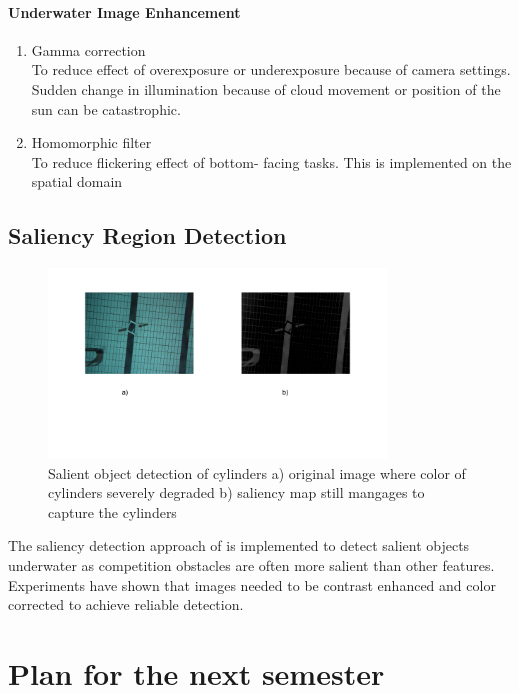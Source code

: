 \documentclass[fypca]{socreport}
\begin{document}
\subsubsection{Underwater Image Enhancement}
    \begin{enumerate}
        \item Gamma correction \\ To reduce effect of overexposure or underexposure because of camera settings. Sudden change in illumination because of cloud movement or position of the sun can be catastrophic.
        \item Homomorphic filter \\ To reduce flickering effect of bottom- facing tasks. This is implemented on the spatial domain \cite{nnolim2008homomorphic}
    \end{enumerate}
    
\section{Saliency Region Detection}
\begin{figure}[h]
    \centering
            \includegraphics[width=0.8\textwidth, height=0.3\textheight]{saliency.png}
            \caption{Salient object detection of cylinders a) original image where color of cylinders severely degraded b) saliency map still mangages to capture the cylinders}
            \label{fig:saliency_detection}
    \end{figure}
The saliency detection approach of \cite{achanta2009frequency} is implemented to detect salient objects underwater as competition obstacles are often more salient than other features. Experiments have shown that images needed to be contrast enhanced and color corrected to achieve reliable detection. 

\chapter{Plan for the next semester}
\end{document}

